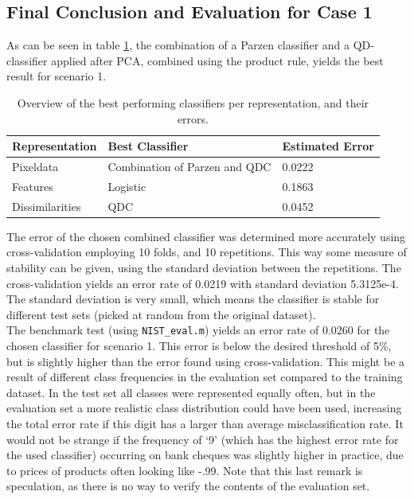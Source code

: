 \subsection{Final Conclusion and Evaluation for Case 1}
As can be seen in table \ref{tab:concase1}, the combination of a Parzen classifier and a QD-classifier applied after PCA, combined using the product rule, yields the best result for scenario 1. 
\begin{table}[H]
	\centering
	\caption{Overview of the best performing classifiers per representation, and their errors.}
	\label{tab:concase1}
	\begin{tabular}{l|ll}
		Representation  & Best Classifier               & Estimated Error \\ \hline
		Pixeldata       & Combination of Parzen and QDC & 0.0222          \\
		Features        & Logistic                      & 0.1863          \\
		Dissimilarities & QDC                           & 0.0452         
	\end{tabular}
\end{table}
\noindent The error of the chosen combined classifier was determined more accurately using cross-validation employing 10 folds, and 10 repetitions. This way some measure of stability can be given, using the standard deviation between the repetitions. The cross-validation yields an error rate of 0.0219 with standard deviation 5.3125e-4. The standard deviation is very small, which means the classifier is stable for different test sets (picked at random from the original dataset).\\
The benchmark test (using \texttt{NIST\_eval.m}) yields an error rate of 0.0260 for the chosen classifier for scenario 1. This error is below the desired threshold of 5\%, but is slightly higher than the error found using cross-validation. This might be a result of different class frequencies in the evaluation set compared to the training dataset. In the test set all classes were represented equally often, but in the evaluation set a more realistic class distribution could have been used, increasing the total error rate if this digit has a larger than average misclassification rate. It would not be strange if the frequency of ‘9’ (which has the highest error rate for the used classifier) occurring on bank cheques was slightly higher in practice, due to prices of products often looking like -.99. Note that this last remark is speculation, as there is no way to verify the contents of the evaluation set.





